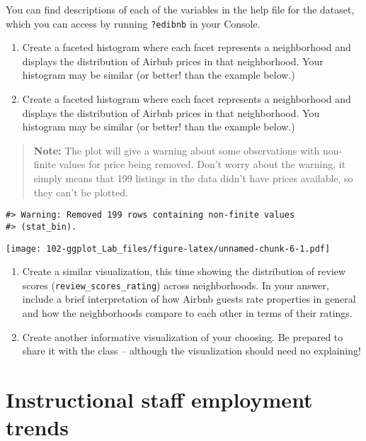 \documentclass[
]{book}
\begin{document}
You can find descriptions of each of the variables in the help file for the dataset, which you can access by running \texttt{?edibnb} in your Console.

\begin{enumerate}
\def\labelenumi{\arabic{enumi}.}
\setcounter{enumi}{3}
\item
  Create a faceted histogram where each facet represents a neighborhood and displays the distribution of Airbnb prices in that neighborhood. Your histogram may be similar (or better! than the example below.)
\item
  Create a faceted histogram where each facet represents a neighborhood and displays the distribution of Airbnb prices in that neighborhood. You histogram may be similar (or better! than the example below.)
\end{enumerate}

\begin{quote}
\textbf{Note:} The plot will give a warning about some observations with non-finite values for price being removed. Don't worry about the warning, it simply means that 199 listings in the data didn't have prices available, so they can't be plotted.
\end{quote}

\begin{verbatim}
#> Warning: Removed 199 rows containing non-finite values
#> (stat_bin).
\end{verbatim}

\texttt{[image: 102-ggplot\_Lab\_files/figure-latex/unnamed-chunk-6-1.pdf]}

\begin{enumerate}
\def\labelenumi{\arabic{enumi}.}
\setcounter{enumi}{5}
\item
  Create a similar visualization, this time showing the distribution of review scores (\texttt{review\_scores\_rating}) across neighborhoods. In your answer, include a brief interpretation of how Airbnb guests rate properties in general and how the neighborhoods compare to each other in terms of their ratings.
\item
  Create another informative visualization of your choosing. Be prepared to share it with the class -- although the visualization should need no explaining!
\end{enumerate}

\hypertarget{instructional-staff-employment-trends}{%
\section{Instructional staff employment trends}\label{instructional-staff-employment-trends}}
\end{document}
